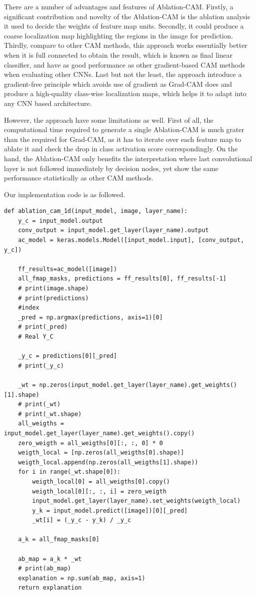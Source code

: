 \documentclass[conference]{IEEEtran}
\begin{document}
There are a number of advantages and features of Ablation-CAM. Firstly, a significant contribution and novelty of the Ablation-CAM is the ablation analysis it used to decide the weights of feature map units. Secondly, it could produce a coarse localization map highlighting the regions in the image for prediction. Thirdly, compare to other CAM methods, this approach works essentially better when it is full connected to obtain the result, which is known as final linear classifier, and have as good performance as other gradient-based CAM methods when evaluating other CNNs. Last but not the least, the approach introduce a gradient-free principle which avoids use of gradient as Grad-CAM does and produce a high-quality class-wise localization maps, which helps it to adapt into any CNN based architecture.\par
However, the approach have some limitations as well. First of all, the computational time required to generate a single Ablation-CAM is much grater than the required for Grad-CAM, as it has to iterate over each feature map to ablate it and check the drop in class activation score correspondingly. 
On the hand, the Ablation-CAM only benefits the interpretation where last convolutional layer is not followed immediately by decision nodes, yet show the same performance statistically as other CAM methods.\par

Our implementation code is as followed.

\begin{lstlisting}
def ablation_cam_1d(input_model, image, layer_name):
    y_c = input_model.output
    conv_output = input_model.get_layer(layer_name).output
    ac_model = keras.models.Model([input_model.input], [conv_output, y_c])

    ff_results=ac_model([image])
    all_fmap_masks, predictions = ff_results[0], ff_results[-1]
    # print(image.shape)
    # print(predictions)
    #index
    _pred = np.argmax(predictions, axis=1)[0]
    # print(_pred)
    # Real Y_C

    _y_c = predictions[0][_pred]
    # print(_y_c)

    _wt = np.zeros(input_model.get_layer(layer_name).get_weights()[1].shape)
    # print(_wt)
    # print(_wt.shape)
    all_weigths = input_model.get_layer(layer_name).get_weights().copy()
    zero_weigth = all_weigths[0][:, :, 0] * 0
    weigth_local = [np.zeros(all_weigths[0].shape)]
    weigth_local.append(np.zeros(all_weigths[1].shape))
    for i in range(_wt.shape[0]):
        weigth_local[0] = all_weigths[0].copy()
        weigth_local[0][:, :, i] = zero_weigth
        input_model.get_layer(layer_name).set_weights(weigth_local)
        y_k = input_model.predict([image])[0][_pred]
        _wt[i] = (_y_c - y_k) / _y_c

    a_k = all_fmap_masks[0]

    ab_map = a_k * _wt
    # print(ab_map)
    explanation = np.sum(ab_map, axis=1)
    return explanation
\end{lstlisting}
\end{document}
